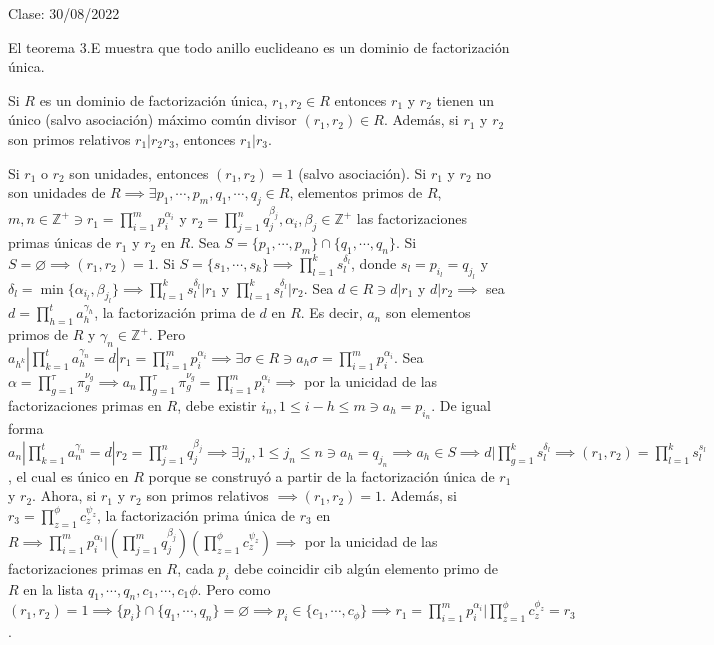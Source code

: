 Clase: 30/08/2022

\begin{ejemplo}
    El teorema 3.E muestra que todo anillo euclideano es un dominio de factorización única. 
\end{ejemplo}

\begin{lema}[3.25]
    Si $R$ es un dominio de factorización única, $r_1,r_2\in R$ entonces $r_1$ y $r_2$ tienen un único (salvo asociación) máximo común divisor $(r_1,r_2)\in R$. Además, si $r_1$ y $r_2$ son primos relativos $r_1|r_2r_3$, entonces $r_1|r_3$.
    \begin{dem}
        Si $r_1$ o $r_2$ son unidades, entonces $(r_1,r_2)=1$ (salvo asociación). Si $r_1$ y $r_2$ no son unidades de $R\implies \exists p_1,\cdots, p_m,q_1,\cdots,q_j\in R$, elementos primos de $R$, $m,n\in\mathbb{Z}^+\ni r_1=\prod_{i=1}^{m}p_i^{\alpha_i}$ y $r_2=\prod_{j=1}^n q_j^{\beta_j}, \alpha_i,\beta_j\in\mathbb{Z}^+$ las factorizaciones primas únicas de $r_1$ y $r_2$ en $R$. Sea $S=\{p_1,\cdots, p_m\}\cap \{q_1,\cdots,q_n\}$. Si $S=\varnothing\implies (r_1,r_2)=1$. Si $S=\{s_1,\cdots,s_k\}\implies \prod_{l=1}^k s_l^{\delta_l}$, donde $s_l=p_{i_l}=q_{j_l}$ y $\delta_l=\min\{\alpha_{i_l},\beta_{j_l}\}\implies \prod_{l=1}^k s_l^{\delta_l}|r_1$ y $\prod_{l=1}^k s_l^{\delta_l}|r_2$. Sea $d\in R\ni d|r_1$ y $d|r_2\implies$ sea $d=\prod_{h=1}^{t}a_h^{\gamma_h}$, la factorización prima de $d$ en $R$. Es decir, $a_n$ son elementos primos de $R$ y $\gamma_n\in\mathbb{Z}^+$. Pero $a_{h^k}|\prod_{k=1}^{t}a_h^{\gamma_n}=d|r_1=\prod_{i=1}^m p_i^{\alpha_i}\implies \exists \sigma \in R\ni a_{h}\sigma =\prod_{i=1}^m p_i^{\alpha_i}$. Sea $\alpha =\prod_{g=1}^\tau \pi_g^{\nu_g}\implies a_n\prod_{g=1}^\tau \pi_g^{\nu_g}=\prod_{i=1}^m p_i^{\alpha_i}\implies$ por la unicidad de las factorizaciones primas en $R$, debe existir $i_n,1\leq i-h\leq m\ni a_h=p_{i_n}$. De igual forma $a_n|\prod_{k=1}^t a_n^{\gamma_n}=d|r_2=\prod_{j=1}^n q_j^{\beta_j}\implies \exists j_n,1\leq j_n\leq n\ni a_h=q_{j_n}\implies a_h\in S\implies d|\prod_{g=1}^ks_l^{\delta_l}\implies (r_1,r_2)=\prod_{l=1}^k s_l^{s_l}$, el cual es único en $R$ porque se construyó a partir de la factorización única de $r_1$ y $r_2$. Ahora, si $r_1$ y $r_2$ son primos relativos $\implies (r_1,r_2)=1$. Además, si $r_3=\prod_{z=1}^\phi c_z^{\psi_z}$, la factorización prima única de $r_3$ en $R\implies \prod_{i=1}^mp_i^{\alpha_i}|\left(\prod_{j=1}^m q_j^{\beta_j}\right)\left(\prod_{z=1}^{\phi}c_z^{\psi_z}\right)\implies $ por la unicidad de las factorizaciones primas en  $R$, cada $p_i$ debe coincidir cib algún elemento primo de $R$ en la lista $q_1,\cdots,q_n,c_1,\cdots,c_1\phi$. Pero como $(r_1,r_2)=1\implies \{p_i\}\cap \{q_1,\cdots,q_n\}=\varnothing\implies p_i\in\{c_1,\cdots, c_\phi\}\implies r_1=\prod_{i=1}^mp_i^{\alpha_i}|\prod_{z=1}^{\phi}c_z^{\phi_z}=r_3$.
       \end{dem} 
\end{lema}

